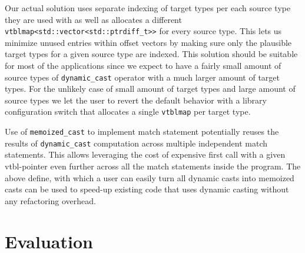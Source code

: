 \documentclass[preprint]{sigplanconf}
\makeatletter
\DeclareRobustCommand{\code}[1]{{\lstinline[breaklines=false,escapechar=@]{#1}}}
\makeatother
\begin{document}
Our actual solution uses separate indexing of target types per each source type 
they are used with as well as allocates a different 
\code{vtblmap<std::vector<std::ptrdiff_t>>} for every source type. This lets us 
minimize unused entries within offset vectors by making sure only the plausible 
target types for a given source type are indexed. This solution should be 
suitable for most of the applications since we expect to have a fairly small 
amount of source types of \code{dynamic_cast} operator with a much larger amount 
of target types. For the unlikely case of small amount of target types and large 
amount of source types we let the user to revert the default behavior with a 
library configuration switch that allocates a single \code{vtblmap} per target type.

Use of \code{memoized_cast} to implement match statement potentially reuses the 
results of \code{dynamic_cast} computation across multiple independent match 
statements. This allows leveraging the cost of expensive first call with a 
given vtbl-pointer even further across all the match statements inside the 
program. The above define, with which a user can easily turn all dynamic casts 
into memoized casts can be used to speed-up existing code that uses dynamic 
casting without any refactoring overhead.

\section{Evaluation} %
\label{sec:eval}
\end{document}
